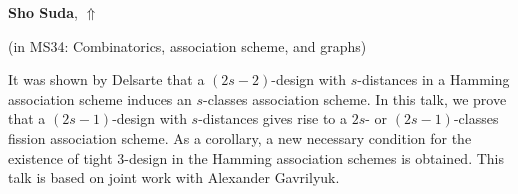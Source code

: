 \documentclass[ILAS2025-program.tex]{subfiles}
\begin{document}
\hypertarget{down0323}{}\begin{ilasabstract}
    
\textbf{Sho Suda},  \hfill \hyperlink{up0323}{$\Uparrow$}
    
    
(in {\color{mstitle}MS34: Combinatorics, association scheme, and graphs})
        
\mtskip
    It was shown by Delsarte that a $(2s-2)$-design with $s$-distances in a Hamming association scheme 
induces an $s$-classes association scheme. 
In this talk, we prove that a $(2s-1)$-design with $s$-distances gives rise to a $2s$- 
or $(2s-1)$-classes fission association scheme. 
As a corollary, a new necessary condition for the existence of tight $3$-design in the Hamming association schemes is obtained. 
This talk is based on joint work with Alexander Gavrilyuk. 

\end{ilasabstract}
    
\end{document}

